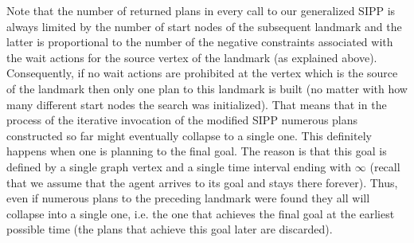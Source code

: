 \documentclass[letterpaper]{article} %
\newcommand{\ccbsds}{\ac{CCBS-DS}\xspace}
\newcommand{\sipp}{\ac{SIPP}\xspace}
\begin{document}



Note that the number of returned plans in every call to our generalized \sipp is always limited by the number of start nodes of the subsequent landmark and the latter is proportional to the number of the negative constraints associated with the wait actions 
for the source vertex of the landmark (as explained above). 
Consequently, if no wait actions are prohibited at the vertex which is the source of the landmark then only one plan to this landmark is built (no matter with how many different start nodes the search was initialized). 
That means that in the process of the iterative invocation of the modified \sipp numerous plans constructed so far might eventually collapse to a single one. This definitely happens when one is planning to the final goal. The reason is that this goal is defined by a single graph vertex and a single time interval ending with $\infty$ (recall that we assume that the agent arrives to its goal and stays there forever). Thus, even if numerous plans to the preceding landmark were found they all will collapse into a single one, i.e. the one that achieves the final goal at the earliest possible time (the plans that achieve this goal later are discarded).
 
 
 
 
 
 
 

\end{document}
